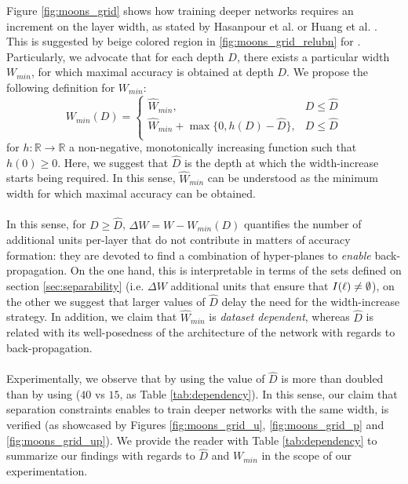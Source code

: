 Figure \ref{fig:moons_grid} shows how training deeper networks requires an increment on the layer width, as stated by Hasanpour et al. \cite{simpnet} or Huang et al. \cite{densenet}. This is suggested by beige colored region in \ref{fig:moons_grid_relubn} for \ReLUBN. Particularly, we advocate that for each depth $D$, there exists a particular width $W_{min}$, for which maximal accuracy is obtained at depth $D$. We propose the following definition for $W_{min}$:
\begin{equation}\label{eq:dependencyWidthDepth}
 W_{min}(D) = 
 \begin{cases}
 \hat{W}_{min}, & D\leq \hat{D}\\
 \hat{W}_{min}+\max\{0,h(D)-\hat{D}\}, & D\leq \hat{D}\\
 \end{cases}
\end{equation}
for $h:\mathbb{R}\rightarrow\mathbb{R}$ a non-negative, monotonically increasing function such that $h(0)\geq 0$. 
Here, we suggest that $\hat{D}$ is the depth at which the width-increase starts being required. In this sense, $\hat{W}_{min}$ can be understood as the minimum width for which maximal accuracy can be obtained. 
\\\\
In this sense, for $D\geq \hat{D}$, $\Delta{W} = W-W_{min}(D)$ quantifies the number of additional units per-layer that do not contribute in matters of accuracy formation: they are devoted to find a combination of hyper-planes to \emph{enable} back-propagation. On the one hand, this is interpretable in terms of the sets defined on section \ref{sec:separability} (i.e. $\Delta{W}$ additional units that ensure that $I(\ell)\neq\emptyset$), on the other we suggest that larger values of $\hat{D}$ delay the need for the width-increase strategy. In addition, we claim that $\hat{W}_{min}$ is \emph{dataset dependent}, whereas $\hat{D}$ is related with its well-posedness of the architecture of the network with regards to back-propagation.
\\\\
Experimentally, we observe that by using \SepUnitPoint the value of $\hat{D}$ is more than doubled than by using \ReLUBN ($40$ vs $15$, as Table \ref{tab:dependency}). In this sense, our claim  that separation constraints enables to train deeper networks with the same width, is verified (as showcased by Figures \ref{fig:moons_grid_u}, \ref{fig:moons_grid_p} and \ref{fig:moons_grid_up}). We provide the reader with Table \ref{tab:dependency} to summarize our findings with regards to $\hat{D}$ and $W_{min}$ in the scope of our experimentation. 
\\\\


